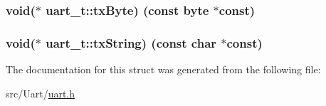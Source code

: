 \subsubsection[{tx\+Byte}]{\setlength{\rightskip}{0pt plus 5cm}void($\ast$ uart\+\_\+t\+::tx\+Byte) (const {\bf byte} $\ast$const)}\label{structuart__t_a19ba83eb9b51411a928172e86f8e24c7}
\hypertarget{structuart__t_acfb091eb7a2d998bc3750b2202aec545}{}
\subsubsection[{tx\+String}]{\setlength{\rightskip}{0pt plus 5cm}void($\ast$ uart\+\_\+t\+::tx\+String) (const char $\ast$const)}\label{structuart__t_acfb091eb7a2d998bc3750b2202aec545}


The documentation for this struct was generated from the following file\+:\begin{DoxyCompactItemize}
\item 
src/\+Uart/\hyperlink{uart_8h}{uart.\+h}\end{DoxyCompactItemize}
